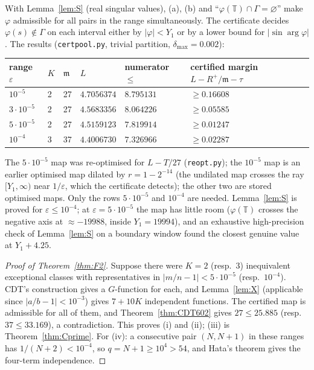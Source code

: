\documentclass[11pt]{amsart}
\theoremstyle{definition}
\theoremstyle{remark}
\numberwithin{equation}{section}
\newcommand{\TT}{\mathbb{T}}
\newcommand{\fm}{\mathfrak{m}}
\newcommand{\file}[1]{{\def\_{\textunderscore\allowbreak}\texttt{#1}}}
\begin{document}
With Lemma~\ref{lem:S} (real singular values), (a), (b) and ``$\varphi(\TT)\cap\Gamma=\varnothing$'' make $\varphi$
admissible for all pairs in the range simultaneously. The certificate decides $\varphi(s)\notin\Gamma$ on each interval
either by $|\varphi|<Y_1$ or by a lower bound for $|\sin\arg\varphi|$. The results (\file{cert\_pool.py}, trivial
partition, $\delta_{\max}=0.002$):
\begin{center}
\small
\begin{tabular}{llllll}
\toprule
range $\varepsilon$ & $K$ & $\fm$ & $L$ & numerator $\le$ & certified margin $L-R^+/\fm-\tau$\\
\midrule
$10^{-5}$ & 2 & 27 & $4.7056374$ & $8.795131$ & $\ge0.16608$\\
$3\cdot10^{-5}$ & 2 & 27 & $4.5683356$ & $8.064226$ & $\ge0.05585$\\
$5\cdot10^{-5}$ & 2 & 27 & $4.5159123$ & $7.819914$ & $\ge0.01247$\\
$10^{-4}$ & 3 & 37 & $4.4006730$ & $7.326966$ & $\ge0.02287$\\
\bottomrule
\end{tabular}
\end{center}
The $5\cdot10^{-5}$ map was re-optimised for $L-T/27$ (\file{reopt.py}); the $10^{-5}$ map is an earlier optimised map
dilated by $r=1-2^{-14}$ (the undilated map crosses the ray $[Y_1,\infty)$ near $1/\varepsilon$, which the certificate
detects); the other two are stored optimised maps. Only the rows $5\cdot10^{-5}$ and $10^{-4}$ are needed. Lemma~\ref{lem:S}
is proved for $\varepsilon\le10^{-4}$; at $\varepsilon=5\cdot10^{-5}$ the map has little room ($\varphi(\TT)$ crosses the
negative axis at $\approx-19988$, inside $Y_1=19994$), and an exhaustive high-precision check of Lemma~\ref{lem:S} on a
boundary window found the closest genuine value at $Y_1+4.25$.

\begin{proof}[Proof of Theorem~\ref{thm:F2}]
Suppose there were $K=2$ (resp.\ $3$) inequivalent exceptional classes with representatives in $|m/n-1|<5\cdot10^{-5}$
(resp.\ $10^{-4}$). CDT's construction gives a $G$-function for each, and Lemma~\ref{lem:X} (applicable since
$|a/b-1|<10^{-3}$) gives $7+10K$ independent functions. The certified map is admissible for all of them, and
Theorem~\ref{thm:CDT602} gives $27\le25.885$ (resp.\ $37\le33.169$), a contradiction. This proves (i) and (ii); (iii) is
Theorem~\ref{thm:Cprime}. For (iv): a consecutive pair $(N,N+1)$ in these ranges has $1/(N+2)<10^{-4}$, so
$q=N+1\ge10^4>54$, and Hata's theorem gives the four-term independence.
\end{proof}
\end{document}
